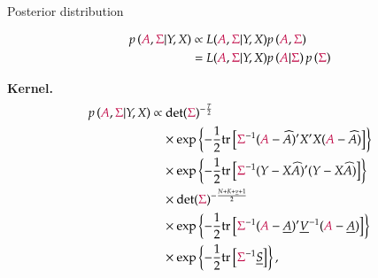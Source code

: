 \documentclass[notes,blackandwhite,mathsans,usenames,dvipsnames]{beamer}
\begin{document}
\begin{frame}{Posterior distribution}

\begin{align*} 
p\left( {\color{purple}A}, {\color{purple}\Sigma}|Y,X \right) &\propto L({\color{purple}A},{\color{purple}\Sigma}|Y,X)p\left( {\color{purple}A}, {\color{purple}\Sigma} \right)\\
&= L({\color{purple}A},{\color{purple}\Sigma}|Y,X)p\left( {\color{purple}A}| {\color{purple}\Sigma} \right)p\left( {\color{purple}\Sigma} \right)
\end{align*} 

\textbf{Kernel.}
\begin{align*} 
p\left( {\color{purple}A},{\color{purple}\Sigma} |Y,X\right) 
&\propto  \text{det}({\color{purple}\Sigma})^{-\frac{T}{2}}\\
&\quad\times\exp\left\{ -\frac{1}{2}\text{tr}\left[ {\color{purple}\Sigma}^{-1}({\color{purple}A}-\widehat{A})'X'X({\color{purple}A}-\widehat{A}) \right] \right\}\\
&\quad\times \exp\left\{ -\frac{1}{2}\text{tr}\left[ {\color{purple}\Sigma}^{-1}(Y-X\widehat{A})'(Y-X\widehat{A}) \right] \right\}\\
& \quad\times\text{det}({\color{purple}\Sigma})^{-\frac{N+K+\underline{\nu}+1}{2}}\\
&\quad\times\exp\left\{ -\frac{1}{2}\text{tr}\left[ {\color{purple}\Sigma}^{-1}({\color{purple}A}-\underline{A})'\underline{V}^{-1}({\color{purple}A}-\underline{A}) \right] \right\}\\
&\quad\times \exp\left\{ -\frac{1}{2}\text{tr}\left[ {\color{purple}\Sigma}^{-1}\underline{S} \right] \right\},
\end{align*} 

\end{frame}
\end{document}
